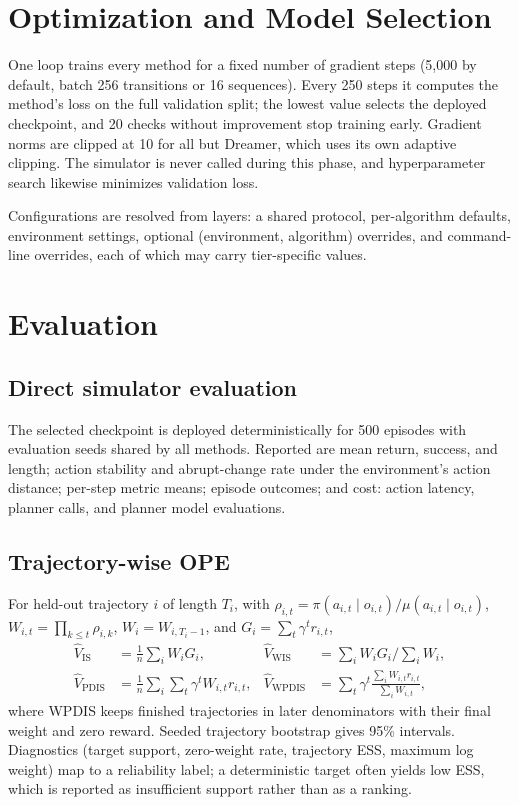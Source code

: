 \documentclass[10pt,twocolumn]{article}
\newcommand{\policy}{\pi}
\newcommand{\behavior}{\mu}
\begin{document}
\section{Optimization and Model Selection}
\label{sec:training}

One loop trains every method for a fixed number of gradient steps (5{,}000 by default, batch 256 transitions or 16 sequences). Every 250 steps it computes the method's loss on the full validation split; the lowest value selects the deployed checkpoint, and 20 checks without improvement stop training early. Gradient norms are clipped at 10 for all but Dreamer, which uses its own adaptive clipping. The simulator is never called during this phase, and hyperparameter search likewise minimizes validation loss.

Configurations are resolved from layers: a shared protocol, per-algorithm defaults, environment settings, optional (environment, algorithm) overrides, and command-line overrides, each of which may carry tier-specific values.

\section{Evaluation}
\label{sec:evaluation}

\subsection{Direct simulator evaluation}

The selected checkpoint is deployed deterministically for 500 episodes with evaluation seeds shared by all methods. Reported are mean return, success, and length; action stability and abrupt-change rate under the environment's action distance; per-step metric means; episode outcomes; and cost: action latency, planner calls, and planner model evaluations.

\subsection{Trajectory-wise OPE}
\label{sec:ope}

For held-out trajectory $i$ of length $T_i$, with $\rho_{i,t}=\policy(a_{i,t}\mid o_{i,t})/\behavior(a_{i,t}\mid o_{i,t})$, $W_{i,t}=\prod_{k\le t}\rho_{i,k}$, $W_i=W_{i,T_i-1}$, and $G_i=\sum_t\gamma^tr_{i,t}$,
\begin{align}
 \widehat V_{\mathrm{IS}}&=\tfrac1n\textstyle\sum_iW_iG_i, &
 \widehat V_{\mathrm{WIS}}&=\textstyle\sum_iW_iG_i/\sum_iW_i,\\
 \widehat V_{\mathrm{PDIS}}&=\tfrac1n\textstyle\sum_i\sum_t\gamma^tW_{i,t}r_{i,t}, &
 \widehat V_{\mathrm{WPDIS}}&=\textstyle\sum_t\gamma^t\frac{\sum_iW_{i,t}r_{i,t}}{\sum_iW_{i,t}},
\end{align}
where WPDIS keeps finished trajectories in later denominators with their final weight and zero reward. Seeded trajectory bootstrap gives 95\% intervals. Diagnostics (target support, zero-weight rate, trajectory ESS, maximum log weight) map to a reliability label; a deterministic target often yields low ESS, which is reported as insufficient support rather than as a ranking.
\end{document}
